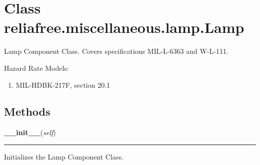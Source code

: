 %
%
%


\section{Class reliafree.miscellaneous.lamp.Lamp}

    \label{reliafree:miscellaneous:lamp:Lamp}
Lamp Component Class. Covers specifications MIL-L-6363 and W-L-111.

Hazard Rate Models:

\begin{enumerate}

\setlength{\parskip}{0.5ex}
  \item MIL-HDBK-217F, section 20.1

\end{enumerate}



  \subsection{Methods}

    \label{reliafree:miscellaneous:lamp:Lamp:__init__}

    \vspace{0.5ex}

\hspace{.8\funcindent}\begin{boxedminipage}{\funcwidth}

    \raggedright \textbf{\_\_init\_\_}(\textit{self})

    \vspace{-1.5ex}

    \rule{\textwidth}{0.5\fboxrule}
\setlength{\parskip}{2ex}
    Initializes the Lamp Component Class.

\setlength{\parskip}{1ex}
    \end{boxedminipage}

